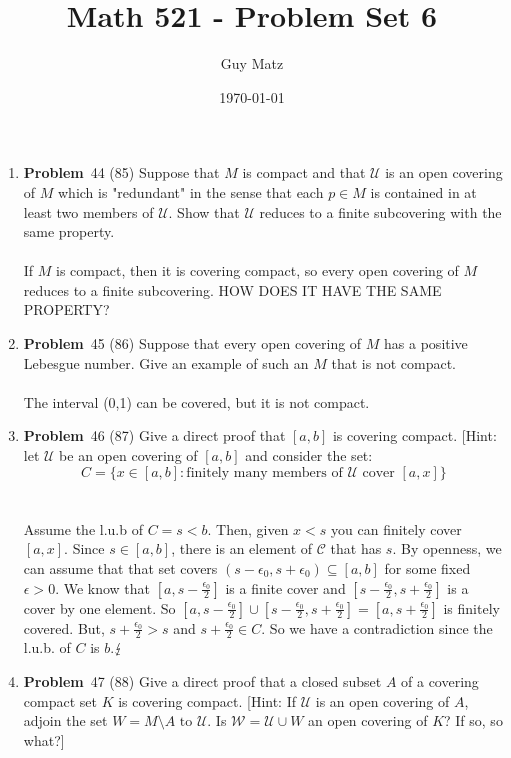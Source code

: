 \documentclass[12pt]{amsart}
\title{\textbf{Math 521 - Problem Set 6}}
\author{Guy Matz}
\date{\today}
\theoremstyle{definition}
\newcommand{\mcU}{\mathcal{U}}
\newcommand{\mcC}{\mathcal{C}}
\newcommand{\itep}{\item {\bfseries Problem}\ }
\begin{document}
 

\maketitle
\newpage %

\begin{enumerate}[series=p]
\itep 44 (85)
Suppose that $M$ is compact and that $\mcU$ is an open covering of $M$ which is "redundant" in the sense that each $p \in M$ is contained in at least two members of $\mcU$.  Show that $\mcU$ reduces to a finite subcovering with the same property.\\
\\
If $M$ is compact, then it is covering compact, so every open covering of $M$ reduces to a finite subcovering.  HOW DOES IT HAVE THE SAME PROPERTY?
\newpage

\itep 45 (86)
Suppose that every open covering of $M$ has a positive Lebesgue number.  Give an example of such an $M$ that is not compact.\\
\\
The interval (0,1) can be covered, but it is not compact.
\newpage

\itep 46 (87)
Give a direct proof that $[a,b]$ is covering compact. [Hint: let $\mcU$ be an open covering of $[a,b]$ and consider the set:
$$C = \{x \in [a,b]: \text{finitely many members of  } \mcU \text{ cover }[a,x] \}$$\\
\\
Assume  the l.u.b of $C = s < b$.  Then, given $x < s$ you can finitely cover $[a,x]$.  Since $s \in [a,b]$, there is an element of $\mcC$ that has $s$.  By openness, we can assume that that set covers $(s - \epsilon_0, s + \epsilon_0) \subseteq [a,b]$ for some fixed $\epsilon > 0$.  We know that $[a, s - \frac{\epsilon_0}{2}]$ is a finite cover and $[s - \frac{\epsilon_0}{2},s + \frac{\epsilon_0}{2}]$ is a cover by one element.  So $[a, s - \frac{\epsilon_0}{2} ] \cup [s - \frac{\epsilon_0}{2}, s + \frac{\epsilon_0}{2} ] = [a, s + \frac{\epsilon_0}{2}]$ is finitely covered.  But, $s + \frac{\epsilon_0}{2} > s$ and $s + \frac{\epsilon_0}{2} \in C$.  So we have a contradiction since the l.u.b. of $C$ is $b$.$\hfill\lightning$
\newpage

\itep 47 (88)
Give a direct proof that a closed subset $A$ of a covering compact set $K$ is covering compact.   [Hint:  If $\mcU$ is an open covering of $A$, adjoin the set $W = M \setminus A \text{ to } \mathcal{U}$.  Is $\mathcal{W} = \mathcal{U} \cup {W}$ an open covering of $K$?  If so, so what?]
\\


\end{enumerate}
\end{document}
